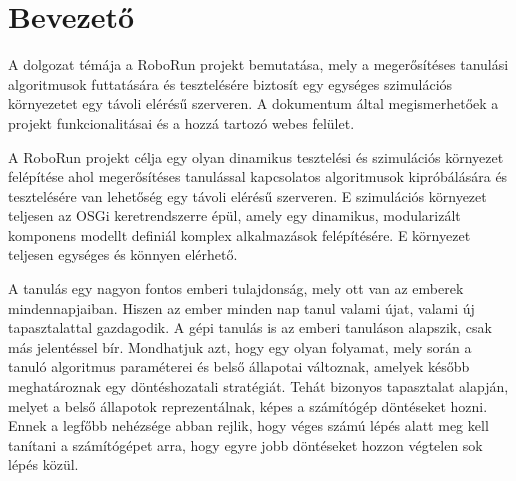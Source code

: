 \chapter{Bevezető}\label{ch:BEVEZETO}
	A dolgozat témája a RoboRun projekt bemutatása, mely a megerősítéses tanulási algoritmusok futtatására és tesztelésére biztosít egy egységes szimulációs környezetet egy távoli elérésű szerveren. A dokumentum által megismerhetőek a projekt funkcionalitásai és a hozzá tartozó webes felület.

	A RoboRun projekt célja egy olyan dinamikus tesztelési és szimulációs környezet felépítése ahol megerősítéses tanulással kapcsolatos algoritmusok kipróbálására és tesztelésére van lehetőség egy távoli elérésű szerveren. E szimulációs környezet teljesen az OSGi\cite{osgi} keretrendszerre épül, amely egy dinamikus, modularizált komponens modellt definiál komplex alkalmazások felépítésére. E környezet teljesen egységes és könnyen elérhető. 
	
	A tanulás egy nagyon fontos emberi tulajdonság, mely ott van az emberek mindennapjaiban. Hiszen az ember minden nap tanul valami újat, valami új tapasztalattal gazdagodik. A gépi tanulás is az emberi tanuláson alapszik, csak más jelentéssel bír. Mondhatjuk azt, hogy egy olyan folyamat, mely során a tanuló algoritmus paraméterei és belső állapotai változnak, amelyek később meghatároznak egy döntéshozatali stratégiát. Tehát bizonyos tapasztalat alapján, melyet a belső állapotok reprezentálnak, képes a számítógép döntéseket hozni. Ennek a legfőbb nehézsége abban rejlik, hogy véges számú lépés alatt meg kell tanítani a számítógépet arra, hogy egyre jobb döntéseket hozzon végtelen sok lépés közül.
	
